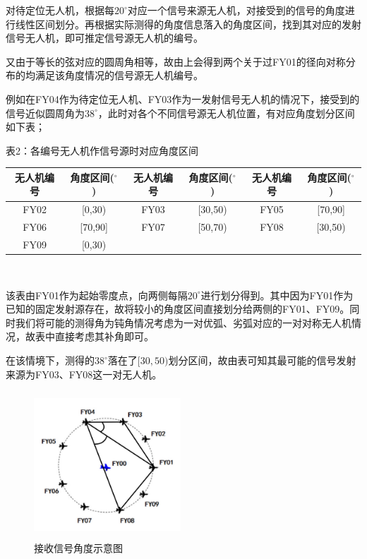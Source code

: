 \documentclass{ctexart}
\begin{document}
对待定位无人机，根据每$20^{\circ}$对应一个信号来源无人机，对接受到的信号的角度进行线性区间划分。再根据实际测得的角度信息落入的角度区间，找到其对应的发射信号无人机，即可推定信号源无人机的编号。

又由于等长的弦对应的圆周角相等，故由上会得到两个关于过FY01的径向对称分布的均满足该角度情况的信号源无人机编号。

例如在FY04作为待定位无人机、FY03作为一发射信号无人机的情况下，接受到的信号近似圆周角为$38^{\circ}$，此时对各个不同信号源无人机位置，有对应角度划分区间如下表；

\begin{center}
  表2：各编号无人机作信号源时对应角度区间
  ~\\
    \begin{tabular}{|c|c|c|c|c|c|}
        \hline
        无人机编号&角度区间($^{\circ}$)&无人机编号&角度区间($^{\circ}$)&无人机编号&角度区间($^{\circ}$)\\
        \hline
        FY02&[0,30)&FY03&[30,50)&FY05&[70,90]\\
        \hline
        FY06&[70,90]&FY07&[50,70)&FY08&[30,50)\\
        \hline
        FY09&[0,30)& & & &\\    
        \hline
    \end{tabular}\\
\end{center}

该表由FY01作为起始零度点，向两侧每隔$20^{\circ}$进行划分得到。其中因为FY01作为已知的固定发射源存在，故将较小的角度区间直接划分给两侧的FY01、FY09。同时我们将可能的测得角为钝角情况考虑为一对优弧、劣弧对应的一对对称无人机情况，故表中直接考虑其补角即可。

在该情境下，测得的$38^{\circ}$落在了$[30,50)$划分区间，故由表可知其最可能的信号发射来源为FY03、FY08这一对无人机。

\begin{figure}[htbp]
  \centering
  \includegraphics[height=5.5cm,width=5.5cm]{pic/example_for_2.a.jpg}
  \caption{接收信号角度示意图}
  \end{figure}
\end{document}

